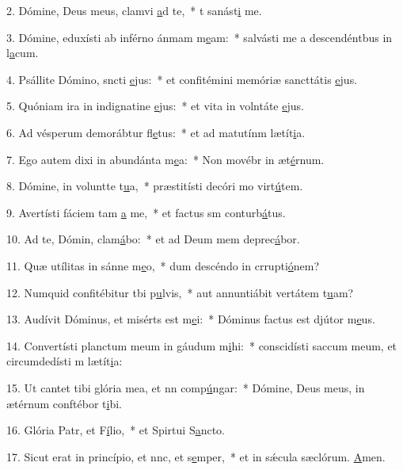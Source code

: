 2. Dómine, Deus meus, clamvi \uline{a}d te,~* t sanást\uline{i} me.\par 
3. Dómine, eduxísti ab inférno ánmam m\uline{e}am:~* salvásti me a descendéntbus in l\uline{a}cum.\par 
4. Psállite Dómino, sncti \uline{e}jus:~* et confitémini memóriæ sancttátis \uline{e}jus.\par 
5. Quóniam ira in indignatine \uline{e}jus:~* et vita in volntáte \uline{e}jus.\par 
6. Ad vésperum demorábtur fl\uline{e}tus:~* et ad matutínm lætít\uline{i}a.\par 
7. Ego autem dixi in abundánta m\uline{e}a:~* Non movébr in æt\uline{é}rnum.\par 
8. Dómine, in voluntte t\uline{u}a,~* præstitísti decóri mo virt\uline{ú}tem.\par 
9. Avertísti fáciem tam \uline{a} me,~* et factus sm conturb\uline{á}tus.\par 
10. Ad te, Dómin, clam\uline{á}bo:~* et ad Deum mem deprec\uline{á}bor.\par 
11. Quæ utílitas in sánne m\uline{e}o,~* dum descéndo in crrupti\uline{ó}nem?\par 
12. Numquid confitébitur tbi p\uline{u}lvis,~* aut annuntiábit vertátem t\uline{u}am?\par 
13. Audívit Dóminus, et misérts est m\uline{e}i:~* Dóminus factus est djútor m\uline{e}us.\par 
14. Convertísti planctum meum in gáudum m\uline{i}hi:~* conscidísti saccum meum, et circumdedísti m lætít\uline{i}a:\par 
15. Ut cantet tibi glória mea, et nn comp\uline{ú}ngar:~* Dómine, Deus meus, in ætérnum conftébor t\uline{i}bi.\par 
16. Glória Patr, et F\uline{í}lio,~* et Spirtui S\uline{a}ncto.\par 
17. Sicut erat in princípio, et nnc, et s\uline{e}mper,~* et in sǽcula sæclórum. \uline{A}men.\par 
